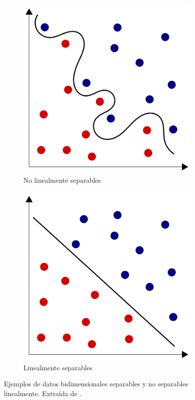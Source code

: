 \documentclass[
  a4paper,
  12pt,
  spanish,
]{scrartcl}
\theoremstyle{teorema-style}
\begin{document}
\begin{figure}[h]
  \centering
  \begin{subfigure}[b]{0.4\textwidth}
    \centering
    \includegraphics[width=.8\textwidth]{img/non-separable}
    \caption{No linealmente separables}
  \end{subfigure}
  \qquad
  \begin{subfigure}[b]{0.4\textwidth}
    \centering
    \includegraphics[width=.8\textwidth]{img/separable}
    \caption{Linealmente separables}
  \end{subfigure}
  \caption{Ejemplos de datos bidimensionales separables y no separables linealmente. Extraída de \parencite{wikipedia_separable}.}
  \label{fig:separable}
\end{figure}
\end{document}
